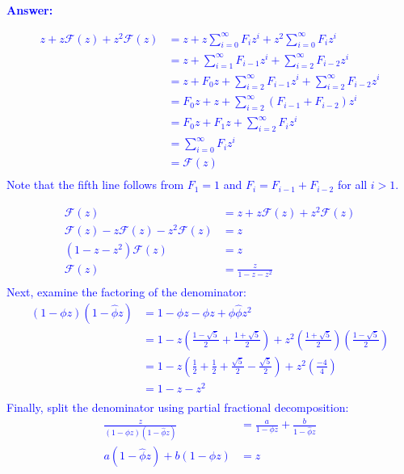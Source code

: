 \textcolor{blue}{
\textbf{Answer:}\\
\begin{list}{\textbf{}}{}
\item\begin{align*}
z+z\mathscr{F}(z)+z^2\mathscr{F}(z)&=z+z\sum_{i=0}^\infty F_iz^i+z^2\sum_{i=0}
^\infty F_iz^i\\
&=z+\sum_{i=1}^\infty F_{i-1}z^i+\sum_{i=2}^\infty F_{i-2}z^i\\
&=z+F_0z+\sum_{i=2}^\infty F_{i-1}z^i+\sum_{i=2}^\infty F_{i-2}z^i\\
&=F_0z+z+\sum_{i=2}^\infty \left(F_{i-1}+F_{i-2}\right)z^i\\
&=F_0z+F_1z+\sum_{i=2}^\infty F_iz^i\\
&=\sum_{i=0}^\infty F_iz^i\\
&=\mathscr{F}(z)\\
\end{align*}\noindent
Note that the fifth line follows from $F_1=1$ and $F_i=F_{i-1}+F_{i-2}$
for all $i>1$.
\item\begin{align*}
\mathscr{F}(z)&=z+z\mathscr{F}(z)+z^2\mathscr{F}(z)\\
\mathscr{F}(z)-z\mathscr{F}(z)-z^2\mathscr{F}(z)&=z\\
\left(1-z-z^2\right)\mathscr{F}(z)&=z\\
\mathscr{F}(z)&=\frac{z}{1-z-z^2}\\
\end{align*}\vskip12pt\noindent
Next, examine the factoring of the denominator:
\begin{align*}
\left(1-\phi z\right)\left(1-\hat\phi z\right)&=1-\hat\phi z-\phi z+\phi\hat\phi
z^2\\
&=1-z\left(\frac{1-\sqrt{5}}{2}+\frac{1+\sqrt{5}}{2}\right)+z^2\left(\frac{1+
\sqrt{5}}{2}\right)\left(\frac{1-\sqrt{5}}{2}\right)\\
&=1-z\left(\frac{1}{2}+\frac{1}{2}+\frac{\sqrt{5}}{2}-\frac{\sqrt{5}}{2}\right)+
z^2\left(\frac{-4}{4}\right)\\
&=1-z-z^2\\
\end{align*}\vskip12pt\noindent
Finally, split the denominator using partial fractional decomposition:
\begin{align*}
\frac{z}{\left(1-\phi z\right)\left(1-\hat\phi z\right)}&=\frac{a}{1-\phi z}+
\frac{b}{1-\hat\phi z}\\
a\left(1-\hat\phi z\right)+b\left(1-\phi z\right)&=z\\

\end{align*}
\end{list}}
